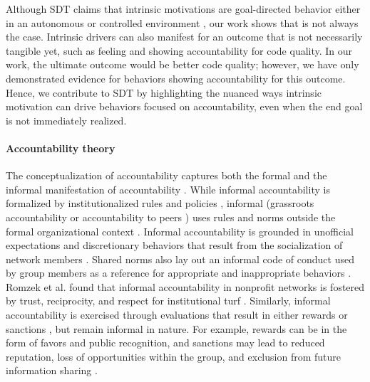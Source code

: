Although SDT claims that intrinsic motivations are goal-directed behavior either in an autonomous or controlled environment \citep{deci2000and}, our work shows that is not always the case. Intrinsic drivers can also manifest for an outcome that is not necessarily tangible yet, such as feeling and showing accountability for code quality. In our work, the ultimate outcome would be better code quality; however, we have only demonstrated evidence for behaviors showing accountability for this outcome. Hence, we contribute to SDT by highlighting the nuanced ways intrinsic motivation can drive behaviors focused on accountability, even when the end goal is not immediately realized.

\paragraph*{Accountability theory} The conceptualization of accountability captures both the formal and the informal manifestation of accountability \cite{frink1998toward}. While informal accountability is formalized by institutionalized rules and policies \cite{frink2008meso}, informal (grassroots accountability or accountability to peers \cite{alami2024understanding}) uses rules and norms outside the formal organizational context \cite{zellars2011accountability}. Informal accountability is grounded in unofficial expectations and discretionary behaviors that result from the socialization of network members \cite{romzek2012preliminary}. Shared norms also lay out an informal code of conduct used by group members as a reference for appropriate and inappropriate behaviors \cite{romzek2012preliminary}. Romzek et al. found that informal accountability in nonprofit networks is fostered by trust, reciprocity, and respect for institutional turf \cite{romzek2012preliminary}. Similarly, informal accountability is exercised through evaluations that result in either rewards or sanctions \cite{romzek2014informal}, but remain informal in nature. For example, rewards can be in the form of favors and public recognition, and sanctions may lead to reduced reputation, loss of opportunities within the group, and exclusion from future information sharing \cite{romzek2014informal}.


